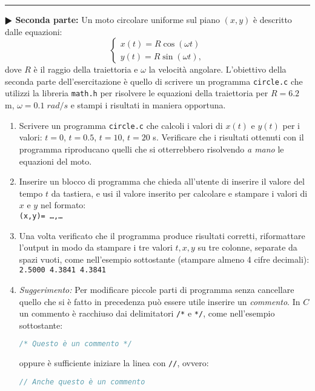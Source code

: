 \documentclass[11pt]{article}
\begin{document}
\hrule
\vspace{1mm}
\textbf{$\RHD$ Seconda parte:} 
Un moto circolare uniforme sul piano $(x,y)$ \`e descritto dalle equazioni:
\[
\left\{ \begin{array}{ll} 
x(t) = R \cos \left(\omega t \right)
\\ 
y(t) = R \sin \left(\omega t \right),
\end{array}
\right.
\]
dove $R$ \`e il raggio della traiettoria e $\omega$ la velocit\`a angolare.
L'obiettivo della seconda parte dell'esercitazione \`e quello di scrivere un programma \texttt{circle.c} che utilizzi la libreria \texttt{math.h}
per risolvere le equazioni della traiettoria per $R=6.2$ m, $\omega=0.1 \; rad/s$ e stampi i risultati in maniera opportuna.

\begin{enumerate}
\item Scrivere un programma \texttt{circle.c} che calcoli i valori di $x(t)$ e $y(t)$ per i valori: $t=0$, $t=0.5$, $t=10$, $t=20$ s.
Verificare che i risultati ottenuti con il programma riproducano quelli che si otterrebbero risolvendo {\em a mano\/} le equazioni del moto.

\item Inserire un blocco di programma che chieda all'utente di inserire il valore del tempo $t$ da tastiera, e usi il valore inserito per calcolare e stampare i valori di $x$ e $y$ nel formato:
  \\
  \texttt{(x,y)= \ldots,\ldots}
  
\item Una volta verificato che il programma produce risultati corretti, riformattare
  l'output in modo da stampare i tre valori $t,x,y$ su tre colonne, separate da spazi vuoti, come nell'esempio sottostante (stampare almeno 4 cifre decimali):
  \\
  \texttt{2.5000    4.3841    4.3841}%
\item {\em Suggerimento:\/} Per modificare piccole parti di programma senza cancellare quello che
  si \`e fatto in precedenza pu\`o essere utile inserire un {\em commento}.
  In $C$ un commento \`e racchiuso dai delimitatori \texttt{/*} e  \texttt{*/}, come nell'esempio
  sottostante:
\begin{lstlisting}[language=c,numbers=none]
  /* Questo è un commento */
\end{lstlisting}%
oppure è sufficiente iniziare la linea con \texttt{//}, ovvero:
\begin{lstlisting}[language=c,numbers=none]
  // Anche questo è un commento
\end{lstlisting}
\end{enumerate}
\end{document}
